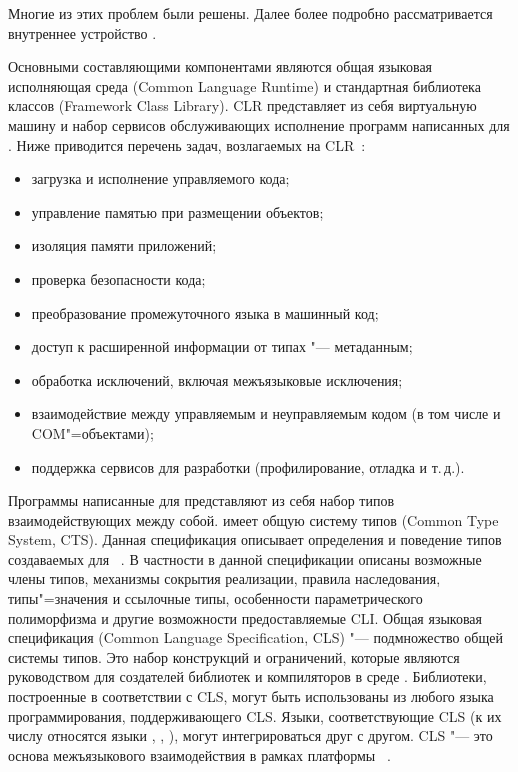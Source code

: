 Многие из этих проблем были решены.
Далее более подробно рассматривается внутреннее устройство \dotnet{}.

Основными составляющими компонентами \dotnet{} являются общая языковая исполняющая среда (Common Language Runtime) и стандартная библиотека классов (Framework Class Library).
CLR представляет из себя виртуальную машину и набор сервисов обслуживающих исполнение программ написанных для \dotnet{}.
Ниже приводится перечень задач, возлагаемых на CLR~\cite{marchenko_2007}:
\begin{itemize}
  \item загрузка и исполнение управляемого кода;
  \item управление памятью при размещении объектов;
  \item изоляция памяти приложений;
  \item проверка безопасности кода;
  \item преобразование промежуточного языка в машинный код;
  \item доступ к расширенной информации от типах "--- метаданным;
  \item обработка исключений, включая межъязыковые исключения;
  \item взаимодействие между управляемым и неуправляемым кодом (в том числе и COM"=объектами);
  \item поддержка сервисов для разработки (профилирование, отладка и т.\,д.).
\end{itemize}

Программы написанные для \dotnet{} представляют из себя набор типов взаимодействующих между собой.
\dotnet{} имеет общую систему типов (Common Type System, CTS).
Данная спецификация описывает определения и поведение типов создаваемых для \dotnet{}~\cite{richter_2012_en}.
В частности в данной спецификации описаны возможные члены типов, механизмы сокрытия реализации, правила наследования, типы"=значения и ссылочные типы, особенности параметрического полиморфизма и другие возможности предоставляемые CLI.
Общая языковая спецификация (Common Language Specification, CLS) "--- подмножество общей системы типов.
Это набор конструкций и ограничений, которые являются руководством для создателей библиотек и компиляторов в среде \netfx{}.
Библиотеки, построенные в соответствии с CLS, могут быть использованы из любого языка программирования, поддерживающего CLS.
Языки, соответствующие CLS (к их числу относятся языки \csharp{}, \vbnet{}, \cppcli{}), могут интегрироваться друг с другом. CLS "--- это основа межъязыкового взаимодействия в рамках платформы \dotnet{}~\cite{marchenko_2007}.

